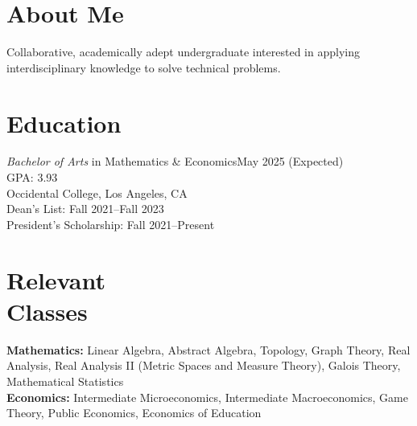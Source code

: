 \documentclass[margin, 12pt]{res} %
\begin{document}
\begin{resume}

\section{\sc About Me}
Collaborative, academically adept undergraduate interested in applying interdisciplinary knowledge to solve technical problems.

\section{\sc Education}

{\sl Bachelor of Arts} in Mathematics \& Economics\hfill May 2025 (Expected) \\
GPA: 3.93\\
Occidental College, Los Angeles, CA \\
Dean's List: Fall 2021--Fall 2023\\
President's Scholarship: Fall 2021--Present
\section{\sc Relevant \\ Classes}

\textbf{Mathematics:} Linear Algebra, Abstract Algebra, Topology, Graph Theory, Real Analysis, Real Analysis II (Metric Spaces and Measure Theory), Galois Theory, Mathematical Statistics\\
\textbf{Economics:} Intermediate Microeconomics, Intermediate Macroeconomics, Game Theory, Public Economics, Economics of Education

 

\end{resume}
\end{document}
